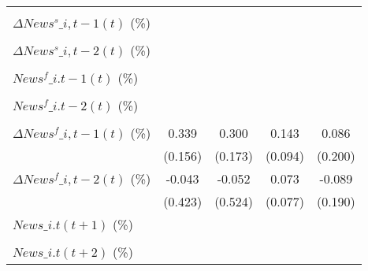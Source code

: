 {\begin{tabular}{l*{4}{c}}
                    &                     &                     &                     &                     \\
\addlinespace
$ \Delta News^s\_{i,t-1}(t)$ (\%)&                     &                     &                     &                     \\
                    &                     &                     &                     &                     \\
\addlinespace
$ \Delta News^s\_{i,t-2}(t)$ (\%)&                     &                     &                     &                     \\
                    &                     &                     &                     &                     \\
\addlinespace
$ News^f\_{i.t-1}(t)$ (\%)&                     &                     &                     &                     \\
                    &                     &                     &                     &                     \\
\addlinespace
$ News^f\_{i.t-2}(t)$ (\%)&                     &                     &                     &                     \\
                    &                     &                     &                     &                     \\
\addlinespace
$ \Delta News^f\_{i,t-1}(t)$ (\%)&       0.339\sym{**} &       0.300         &       0.143         &       0.086         \\
                    &     (0.156)         &     (0.173)         &     (0.094)         &     (0.200)         \\
\addlinespace
$ \Delta News^f\_{i,t-2}(t)$ (\%)&      -0.043         &      -0.052         &       0.073         &      -0.089         \\
                    &     (0.423)         &     (0.524)         &     (0.077)         &     (0.190)         \\
\addlinespace
$ News\_{i.t}(t+1)$ (\%)&                     &                     &                     &                     \\
                    &                     &                     &                     &                     \\
\addlinespace
$ News\_{i.t}(t+2)$ (\%)&                     &                     &                     &                     \\

\end{tabular}}
